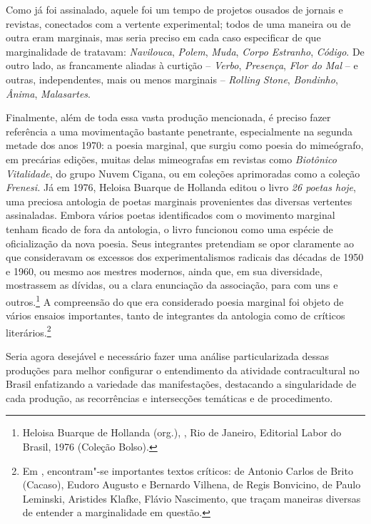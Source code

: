 Como já foi assinalado, aquele foi um tempo de projetos ousados de
jornais e revistas, conectados com a vertente experimental; todos de uma
maneira ou de outra eram marginais, mas seria preciso em cada caso
especificar de que marginalidade de tratavam: \emph{Navilouca},
\emph{Polem}, \emph{Muda}, \emph{Corpo Estranho}, \emph{Código}. De
outro lado, as francamente aliadas à curtição -- \emph{Verbo},
\emph{Presença}, \emph{Flor do Mal} -- e outras, independentes, mais ou
menos marginais -- \emph{Rolling Stone}, \emph{Bondinho}, \emph{Ânima},
\emph{Malasartes}.

Finalmente, além de toda essa vasta produção mencionada, é preciso fazer
referência a uma movimentação bastante penetrante, especialmente na
segunda metade dos anos 1970: a poesia marginal, que surgiu como poesia
do mimeógrafo, em precárias edições, muitas delas mimeografas em
revistas como \emph{Biotônico Vitalidade}, do grupo Nuvem Cigana, ou em
coleções aprimoradas como a coleção \emph{Frenesi.} Já em 1976, Heloisa
Buarque de Hollanda editou o livro \emph{26 poetas hoje}, uma preciosa
antologia de poetas marginais provenientes das diversas vertentes
assinaladas. Embora vários poetas identificados com o movimento marginal
tenham ficado de fora da antologia, o livro funcionou como uma espécie
de oficialização da nova poesia. Seus integrantes pretendiam se opor
claramente ao que consideravam os excessos dos experimentalismos
radicais das décadas de 1950 e 1960, ou mesmo aos mestres modernos,
ainda que, em sua diversidade, mostrassem as dívidas, ou a clara
enunciação da associação, para com uns e outros.\footnote{Heloisa Buarque de Hollanda (org.),
{}, Rio de Janeiro, Editorial Labor do Brasil, 1976 (Coleção Bolso).} A compreensão do que
era considerado poesia marginal foi objeto de vários ensaios
importantes, tanto de integrantes da antologia como de críticos
literários.\footnote{Em {}, encontram"-se
  importantes textos críticos: de Antonio Carlos de Brito (Cacaso),
  Eudoro Augusto e Bernardo Vilhena, de Regis Bonvicino, de Paulo
  Leminski, Aristides Klafke, Flávio Nascimento, que traçam maneiras
  diversas de entender a marginalidade em questão.}

\pagebreak

\asterisc

Seria agora desejável e necessário fazer uma análise particularizada
dessas produções para melhor configurar o entendimento da atividade
contracultural no Brasil enfatizando a variedade das manifestações,
destacando a singularidade de cada produção, as recorrências e
intersecções temáticas e de procedimento.

